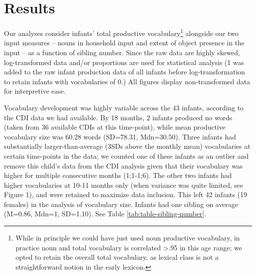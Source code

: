 \documentclass[
  man,mask,floatsintext]{apa6}
\begin{document}
\hypertarget{results}{%
\section{Results}\label{results}}

Our analyses consider infants' total productive vocabulary\footnote{While in principle we could have just used noun productive vocabulary, in practice noun and total vocabulary is correlated \textgreater.95 in this age range; we opted to retain the overall total vocabulary, as lexical class is not a straightforward notion in the early lexicon.} alongside our two input measures -- nouns in household input and extent of object presence in the input -- as a function of sibling number. Since the raw data are highly skewed, log-transformed data and/or proportions are used for statistical analysis (1 was added to the raw infant production data of all infants before log-transformation to retain infants with vocabularies of 0.) All figures display non-transformed data for interpretive ease.

Vocabulary development was highly variable across the 43 infants, according to the CDI data we had available. By 18 months, 2 infants produced no words (taken from 36 available CDIs at this time-point), while mean productive vocabulary size was 60.28 words (SD=78.31, Mdn=30.50). Three infants had substantially larger-than-average (3SDs above the monthly mean) vocabularies at certain time-points in the data; we counted one of these infants as an outlier and remove this child's data from the CDI analysis given that their vocabulary was higher for multiple consecutive months (1;1-1;6). The other two infants had higher vocabularies at 10-11 months only (when variance was quite limited, see Figure 1), and were retained to maximize data inclusion. This left 42 infants (19 females) in the analysis of vocabulary size. Infants had one sibling on average (M=0.86, Mdn=1, SD=1.10). See Table \ref{tab:table-sibling-number}.
\end{document}
